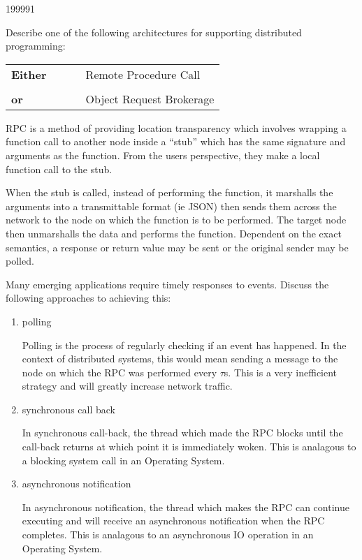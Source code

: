 \documentclass[10pt,\jkfside,a4paper]{article}
\begin{document}
\begin{examquestion}{1999}{9}{1}

Describe one of the following architectures for supporting distributed
programming:

\begin{table}[H]
\begin{tabular}{lll}
\textbf{Either} & \ \ \ & Remote Procedure Call \\
\\
\textbf{or} & & Object Request Brokerage \\
\end{tabular}
\end{table}

RPC is a method of providing location transparency which involves wrapping a
function call to another node inside a ``stub'' which has the same
signature and arguments as the function. From the users perspective, they
make a local function call to the stub.

When the stub is called, instead of performing the function, it marshalls
the arguments into a transmittable format (ie JSON) then sends them across the
network to the node on which the function is to be performed. The target
node then unmarshalls the data and performs the function. Dependent on the
exact semantics, a response or return value may be sent or the original
sender may be polled.

Many emerging applications require timely responses to events. Discuss the
following approaches to achieving this:

\begin{enumerate}[label=(\alph*)]

\item polling

Polling is the process of regularly checking if an event has happened. In
the context of distributed systems, this would mean sending a message to the
node on which the RPC was performed every $\tau$s. This is a very
inefficient strategy and will greatly increase network traffic.

\item synchronous call back

In synchronous call-back, the thread which made the  RPC blocks until the
call-back returns at which point it is immediately woken. This is analagous
to a blocking system call in an Operating System.

\item asynchronous notification

In asynchronous notification, the thread which makes the RPC can continue
executing and will receive an asynchronous notification when the RPC
completes. This is analagous to an asynchronous IO operation in an
Operating System.

\end{enumerate}

\end{examquestion}
\end{document}
